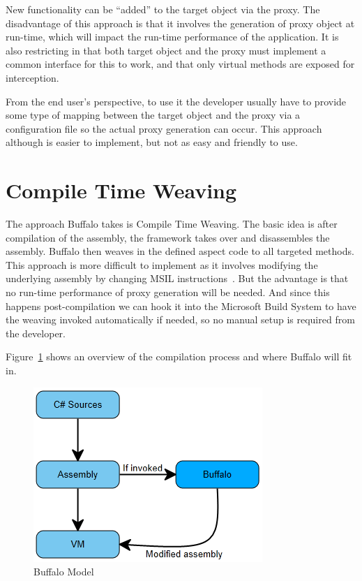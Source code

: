 New functionality can be “added” to the target object via the proxy. The disadvantage of this approach is that it involves the generation of proxy object at run-time, which will impact the run-time performance of the application. It is also restricting in that both target object and the proxy must implement a common interface for this to work, and that only virtual methods are exposed for interception.

From the end user's perspective, to use it the developer usually have to provide some type of mapping between the target object and the proxy via a configuration file so the actual proxy generation can occur. This approach although is easier to implement, but not as easy and friendly to use.

\section{Compile Time Weaving}

The approach Buffalo takes is Compile Time Weaving. The basic idea is after compilation of the assembly, the framework takes over and disassembles the assembly. Buffalo then weaves in the defined aspect code to all targeted methods. This approach is more difficult to implement as it involves modifying the underlying assembly by changing MSIL instructions~\cite{rewrite_msil}. But the advantage is that no run-time performance of proxy generation will be needed. And since this happens post-compilation we can hook it into the Microsoft Build System to have the weaving invoked automatically if needed, so no manual setup is required from the developer.

Figure~\ref{buffalo_model} shows an overview of the compilation process and where Buffalo will fit in.

\begin{figure}[H]
  \includegraphics[scale=1.0]{BuffaloOverview.PNG}
  \centering
  \caption{Buffalo Model\label{buffalo_model}}
\end{figure}

